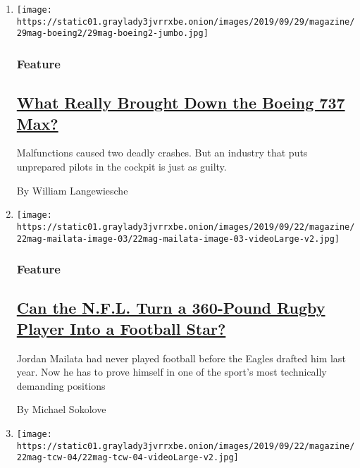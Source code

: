 \begin{enumerate}
\def\labelenumi{\arabic{enumi}.}
\item
  \texttt{[image: https://static01.graylady3jvrrxbe.onion/images/2019/09/29/magazine/29mag-boeing2/29mag-boeing2-jumbo.jpg]}

  \hypertarget{feature}{%
  \subsubsection{Feature}\label{feature}}

  \hypertarget{what-really-brought-down-the-boeing-737-max}{%
  \subsection{\texorpdfstring{\href{/2019/09/18/magazine/boeing-737-max-crashes.html}{What
  Really Brought Down the Boeing 737
  Max?}}{What Really Brought Down the Boeing 737 Max?}}\label{what-really-brought-down-the-boeing-737-max}}

  Malfunctions caused two deadly crashes. But an industry that puts
  unprepared pilots in the cockpit is just as guilty.

  By William Langewiesche
\item
  \texttt{[image: https://static01.graylady3jvrrxbe.onion/images/2019/09/22/magazine/22mag-mailata-image-03/22mag-mailata-image-03-videoLarge-v2.jpg]}

  \hypertarget{feature-1}{%
  \subsubsection{Feature}\label{feature-1}}

  \hypertarget{can-the-nfl-turn-a-360-pound-rugby-player-into-a-football-star}{%
  \subsection{\texorpdfstring{\href{/2019/09/17/magazine/jordan-mailata-eagles-football.html}{Can
  the N.F.L. Turn a 360-Pound Rugby Player Into a Football
  Star?}}{Can the N.F.L. Turn a 360-Pound Rugby Player Into a Football Star?}}\label{can-the-nfl-turn-a-360-pound-rugby-player-into-a-football-star}}

  Jordan Mailata had never played football before the Eagles drafted him
  last year. Now he has to prove himself in one of the sport's most
  technically demanding positions

  By Michael Sokolove
\item
  \texttt{[image: https://static01.graylady3jvrrxbe.onion/images/2019/09/22/magazine/22mag-tcw-04/22mag-tcw-04-videoLarge-v2.jpg]}


\end{enumerate}
